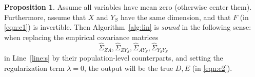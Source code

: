 \documentclass[letterpaper]{article} %
\theoremstyle{definition}%
\theoremstyle{definition}
\newtheorem{proposition}{Proposition}
\newcommand{\Obs}{Y}
\newcommand{\Out}{Z}
\begin{document}
\begin{proposition} %
	\label{thm:lin}
	Assume all variables have mean zero (otherwise center them).
	Furthermore, assume that $X$ and $Y_S$ have the same dimension, and that $F$ (in \eqref{eqn:c1}) is invertible.
	Then Algorithm~\ref{alg:lin} is \emph{sound} in the following sense: when replacing the empirical covariance matrices 
	$$
	\hat{\Sigma}_{Z A}, \hat{\Sigma}_{Z Y_S}, \hat{\Sigma}_{A Y_S}, \hat{\Sigma}_{Y_S Y_S}
	$$
	 in Line~\ref{line:s} by their population-level counterparts, and setting the regularization term $\lambda=0$, the output will be the true $D, E$ (in \eqref{eqn:c2}).
\end{proposition}%
\end{document}
